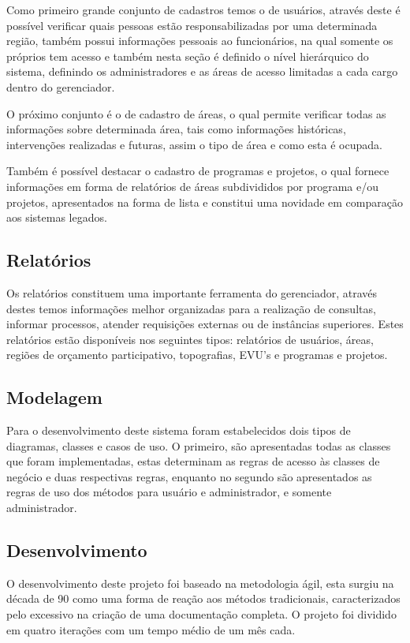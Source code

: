 \documentclass[10pt, twocolumn]{article}
\begin{document}
Como primeiro grande conjunto de cadastros temos o de usuários, através deste é possível verificar quais pessoas estão responsabilizadas por uma determinada região, também possui informações pessoais ao funcionários, na qual somente os próprios tem acesso e também nesta seção é definido o nível hierárquico do sistema, definindo os administradores e as áreas de acesso limitadas a cada cargo dentro do gerenciador.

O próximo conjunto é o de cadastro de áreas, o qual permite verificar todas as informações sobre determinada área, tais como informações históricas, intervenções realizadas e futuras, assim o tipo de área e como esta é ocupada.

Também é possível destacar o cadastro de programas e projetos, o qual fornece informações em forma de relatórios de áreas subdivididos por programa e/ou projetos, apresentados na forma de lista e constitui uma novidade em comparação aos sistemas legados.

\subsection{Relatórios}
\label{rect:rel}
Os relatórios constituem uma importante ferramenta do gerenciador, através destes temos informações melhor organizadas para a realização de consultas, informar processos, atender requisições externas ou de instâncias superiores. Estes relatórios estão disponíveis nos seguintes tipos: relatórios de usuários, áreas, regiões de orçamento participativo, topografias, EVU's e programas e projetos.

\subsection{Modelagem}
\label{rect:model}
Para o desenvolvimento deste sistema foram estabelecidos dois tipos de diagramas, classes e casos de uso. O primeiro, são apresentadas todas as classes que foram implementadas, estas determinam as regras de acesso às classes de negócio e duas respectivas regras, enquanto no segundo são apresentados as regras de uso dos métodos para usuário e administrador, e somente administrador. 

\subsection{Desenvolvimento}
\label{rect:desen}
O desenvolvimento deste projeto foi baseado na metodologia ágil, esta surgiu na década de 90 como uma forma de reação aos métodos tradicionais, caracterizados pelo excessivo na criação de uma documentação completa. O projeto foi dividido em quatro iterações com um tempo médio de um mês cada.
\end{document}
